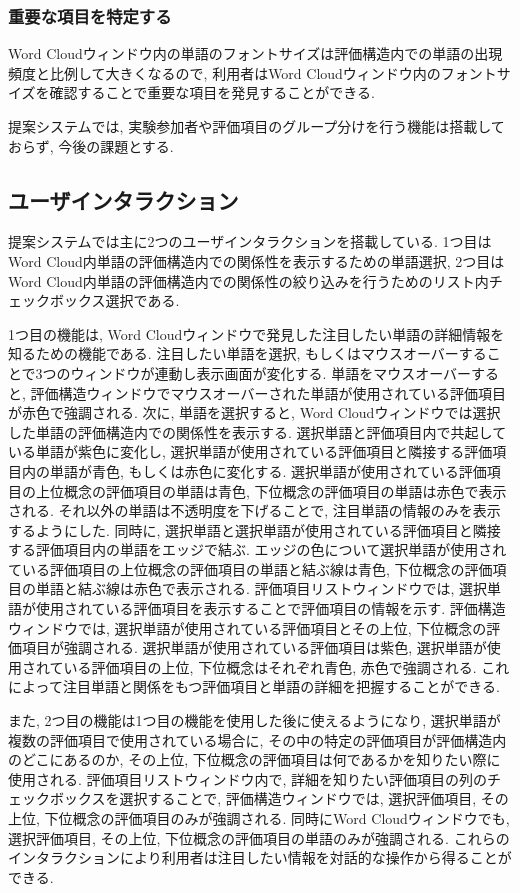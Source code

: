 \documentclass[syuuron]{kuee}
\begin{document}
			\subsubsection{重要な項目を特定する}
				Word Cloudウィンドウ内の単語のフォントサイズは評価構造内での単語の出現頻度と比例して大きくなるので, 
				利用者はWord Cloudウィンドウ内のフォントサイズを確認することで重要な項目を発見することができる. 
			
			提案システムでは, 実験参加者や評価項目のグループ分けを行う機能は搭載しておらず, 今後の課題とする. 			
			
		\subsection{ユーザインタラクション}
			提案システムでは主に2つのユーザインタラクションを搭載している. 
			1つ目はWord Cloud内単語の評価構造内での関係性を表示するための単語選択, 
			2つ目はWord Cloud内単語の評価構造内での関係性の絞り込みを行うためのリスト内チェックボックス選択である. 
			
			1つ目の機能は, Word Cloudウィンドウで発見した注目したい単語の詳細情報を知るための機能である. 
			注目したい単語を選択, もしくはマウスオーバーすることで3つのウィンドウが連動し表示画面が変化する. 
			単語をマウスオーバーすると, 評価構造ウィンドウでマウスオーバーされた単語が使用されている評価項目が赤色で強調される. 
			次に, 単語を選択すると, Word Cloudウィンドウでは選択した単語の評価構造内での関係性を表示する. 
			選択単語と評価項目内で共起している単語が紫色に変化し, 
			選択単語が使用されている評価項目と隣接する評価項目内の単語が青色, もしくは赤色に変化する. 
			選択単語が使用されている評価項目の上位概念の評価項目の単語は青色, 下位概念の評価項目の単語は赤色で表示される. 
			それ以外の単語は不透明度を下げることで, 注目単語の情報のみを表示するようにした. 
			同時に, 選択単語と選択単語が使用されている評価項目と隣接する評価項目内の単語をエッジで結ぶ. 
			エッジの色について選択単語が使用されている評価項目の上位概念の評価項目の単語と結ぶ線は青色, 
			下位概念の評価項目の単語と結ぶ線は赤色で表示される. 
			評価項目リストウィンドウでは, 選択単語が使用されている評価項目を表示することで評価項目の情報を示す. 
			評価構造ウィンドウでは, 選択単語が使用されている評価項目とその上位, 下位概念の評価項目が強調される. 
			選択単語が使用されている評価項目は紫色, 選択単語が使用されている評価項目の上位, 下位概念はそれぞれ青色, 赤色で強調される. 
			これによって注目単語と関係をもつ評価項目と単語の詳細を把握することができる. 
			
			また, 2つ目の機能は1つ目の機能を使用した後に使えるようになり, 
			選択単語が複数の評価項目で使用されている場合に, その中の特定の評価項目が評価構造内のどこにあるのか, 
			その上位, 下位概念の評価項目は何であるかを知りたい際に使用される. 
			評価項目リストウィンドウ内で, 詳細を知りたい評価項目の列のチェックボックスを選択することで, 
			評価構造ウィンドウでは, 選択評価項目, その上位, 下位概念の評価項目のみが強調される. 
			同時にWord Cloudウィンドウでも, 選択評価項目, その上位, 下位概念の評価項目の単語のみが強調される. 
			これらのインタラクションにより利用者は注目したい情報を対話的な操作から得ることができる. 
			
\end{document}
